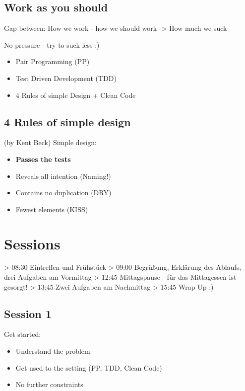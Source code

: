 \documentclass[12pt, xcolor=table, dvipsnames]{beamer}
\begin{document}
\subsection{Work as you should}
\begin{frame}[squeeze]{\subsecname{}}
	Gap between: 
	How we work - how we should work 
	-> How much we suck

	No pressure - try to suck less :)	
	\begin{itemize}
		\item Pair Programming (PP)
		\item Test Driven Development (TDD)
		\item 4 Rules of simple Design	+ Clean Code 	
	\end{itemize}
\end{frame}

\subsection{4 Rules of simple design}
\begin{frame}{\subsecname{} (by Kent Beck)}
	Simple design:\pause
	\begin{itemize}[<+->]
		\item \textbf{\color{red} Passes the tests}
		\item Reveals all intention (Naming!)
		\item Contains no duplication (DRY)
		\item Fewest elements (KISS)
	\end{itemize}
\end{frame}


\section{Sessions}

> 08:30 Eintreffen und Frühstück
> 09:00 Begrüßung, Erklärung des Ablaufs, drei Aufgaben am Vormittag
> 12:45 Mittagspause - für das Mittagessen ist gesorgt!
> 13:45 Zwei Aufgaben am Nachmittag
> 15:45 Wrap Up :)


\subsection{Session 1}
\begin{frame}[squeeze]{\subsecname{}}
	Get started:
	\begin{itemize}
		\item Understand the problem 
		\item Get used to the setting (PP, TDD, Clean Code)
		\item No further constraints
	\end{itemize}
\end{frame}
\end{document}
